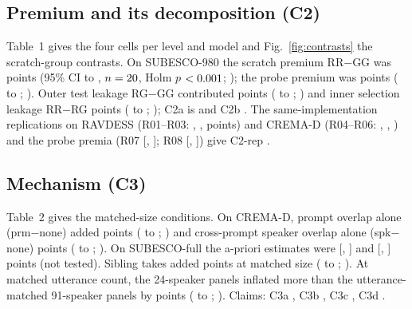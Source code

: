 \documentclass{article}
\begin{document}
\subsection{Premium and its decomposition (C2)}
Table~1 gives the four cells per level and model and Fig.~\ref{fig:contrasts} the scratch-group contrasts.
On SUBESCO-980 the scratch premium RR$-$GG was \HNZeroOneMean{} points (95\% CI \HNZeroOneCILow{} to \HNZeroOneCIHigh, $n=20$, Holm $p$ $<0.001$; \HNZeroOneVerdict); the probe premium was \HNZeroTwoMean{} points (\HNZeroTwoCILow{} to \HNZeroTwoCIHigh; \HNZeroTwoVerdict).
Outer test leakage RG$-$GG contributed \HNZeroThreeMean{} points (\HNZeroThreeCILow{} to \HNZeroThreeCIHigh; \HNZeroThreeVerdict) and inner selection leakage RR$-$RG \HNZeroFourMean{} points (\HNZeroFourCILow{} to \HNZeroFourCIHigh; \HNZeroFourVerdict); C2a is \ClaimCTwoa{} and C2b \ClaimCTwob.
The same-implementation replications on RAVDESS (R01--R03: \HRZeroOneMean, \HRZeroTwoMean, \HRZeroThreeMean{} points) and CREMA-D (R04--R06: \HRZeroFourMean, \HRZeroFiveMean, \HRZeroSixMean) and the probe premia (R07 \HRZeroSevenMean{} [\HRZeroSevenCILow, \HRZeroSevenCIHigh]; R08 \HRZeroEightMean{} [\HRZeroEightCILow, \HRZeroEightCIHigh]) give C2-rep \ClaimCTworep.

\begin{table}[t]
\centering\scriptsize
\caption{Protocol factorial: mean over speakers of the replicate-averaged per-speaker out-of-fold UAR (\%) in the four cells and the three speaker-paired contrasts (points). RR = random outer and inner; RG = random outer, grouped inner; GR = grouped outer, random inner; GG = grouped outer and inner. Contrasts use unrounded means (may differ from rounded-cell differences by 0.01).}
\TabFactorial
\end{table}

\subsection{Mechanism (C3)}
Table~2 gives the matched-size conditions.
On CREMA-D, prompt overlap alone (prm$-$none) added \HNZeroFiveMean{} points (\HNZeroFiveCILow{} to \HNZeroFiveCIHigh; \HNZeroFiveVerdict) and cross-prompt speaker overlap alone (spk$-$none) \HNZeroSixMean{} points (\HNZeroSixCILow{} to \HNZeroSixCIHigh; \HNZeroSixVerdict).
On SUBESCO-full the a-priori estimates were \HNZeroSevenMean{} [\HNZeroSevenCILow, \HNZeroSevenCIHigh] and \HNZeroEightMean{} [\HNZeroEightCILow, \HNZeroEightCIHigh] points (not tested).
Sibling takes added \HNZeroNineMean{} points at matched size (\HNZeroNineCILow{} to \HNZeroNineCIHigh; \HNZeroNineVerdict).
At matched utterance count, the 24-speaker panels inflated more than the utterance-matched 91-speaker panels by \HNOneZeroMean{} points (\HNOneZeroCILow{} to \HNOneZeroCIHigh; \HNOneZeroVerdict).
Claims: C3a \ClaimCThreea, C3b \ClaimCThreeb, C3c \ClaimCThreec, C3d \ClaimCThreed.
\end{document}
